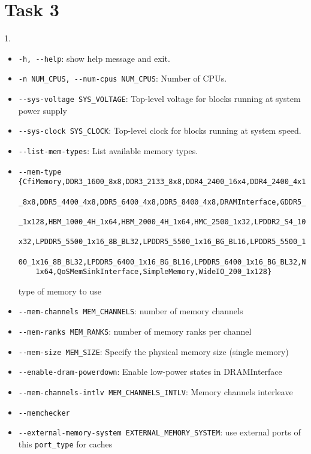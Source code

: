 \documentclass{article}
\begin{document}
\section*{Task 3}
1.\begin{itemize}
	\item \verb|-h, --help|: show help message and exit.
	\item \verb|-n NUM_CPUS, --num-cpus NUM_CPUS|: Number of CPUs.
	\item \verb|--sys-voltage SYS_VOLTAGE|: Top-level voltage for blocks running at system power supply
	\item \verb|--sys-clock SYS_CLOCK|: Top-level clock for blocks running at system speed.
	\item \verb|--list-mem-types|: List available memory types.
	\item \begin{verbatim}--mem-type {CfiMemory,DDR3_1600_8x8,DDR3_2133_8x8,DDR4_2400_16x4,DDR4_2400_4x16,DDR4_2400
	_8x8,DDR5_4400_4x8,DDR5_6400_4x8,DDR5_8400_4x8,DRAMInterface,GDDR5_4000_2x32,HBM_1000_4H
	_1x128,HBM_1000_4H_1x64,HBM_2000_4H_1x64,HMC_2500_1x32,LPDDR2_S4_1066_1x32,LPDDR3_1600_1
	x32,LPDDR5_5500_1x16_8B_BL32,LPDDR5_5500_1x16_BG_BL16,LPDDR5_5500_1x16_BG_BL32,LPDDR5_64
	00_1x16_8B_BL32,LPDDR5_6400_1x16_BG_BL16,LPDDR5_6400_1x16_BG_BL32,NVMInterface,NVM_2400_
	1x64,QoSMemSinkInterface,SimpleMemory,WideIO_200_1x128}\end{verbatim}
	type of memory to use
	\item \verb|--mem-channels MEM_CHANNELS|: number of memory channels
	\item \verb|--mem-ranks MEM_RANKS|: number of memory ranks per channel
	\item \verb|--mem-size MEM_SIZE|: Specify the physical memory size (single memory)
	\item \verb|--enable-dram-powerdown|: Enable low-power states in DRAMInterface
	\item \verb|--mem-channels-intlv MEM_CHANNELS_INTLV|: Memory channels interleave
	\item \verb|--memchecker|
	\item \verb|--external-memory-system EXTERNAL_MEMORY_SYSTEM|: use external ports of this \verb|port_type| for caches
	

\end{itemize}
\end{document}
